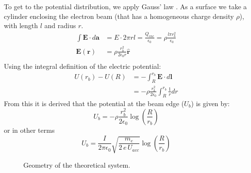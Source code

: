 To get to the potential distribution, we apply Gauss' law \cite{GriffithsEM}. As a surface we take a cylinder enclosing the electron beam (that has a homogeneous charge density $\rho$), with length $l$ and radius $r$.
\begin{align}
\int\textbf{E}\cdot d\mathbf{a} &= E\cdot2\pi r l = \frac{Q_{enc}}{\epsilon_0} = \rho \frac{l\pi r_b^2}{\epsilon_0} \\
\mathbf{E}(\mathbf{r}) &= \rho \frac{r_b^2}{2\epsilon_0r}\hat{\mathbf{r}} \\
\end{align}
Using the integral definition of the electric potential:
\begin{align}
U(r_b)-U(R) &= -\int_R^{r_b} \mathbf{E}\cdot d\mathbf{l} \nonumber \\
&= - \rho \frac{r_b^2}{2\epsilon_0}  \int_R^{r_b} \frac{1}{r} dr
\end{align}
From this it is derived that the potential at the beam edge ($U_b$) is given by:
\begin{equation}
\label{eq:vbeamrho}
U_b = - \rho \frac{r_b^2}{2\epsilon_0} \log\left(\frac{R}{r_b}\right)
\end{equation}
or in other terms
\begin{equation}
\label{eq:vbeamI}
U_b=\frac{I}{2\pi\epsilon_0}\sqrt{\frac{m_e}{2\,e\,U_{acc}}}\log\left(\frac{R}{r_b}\right)
\end{equation}

\begin{figure}
\centering

\caption{Geometry of the theoretical system.}
\label{fig:theorygeometry}
\end{figure}

